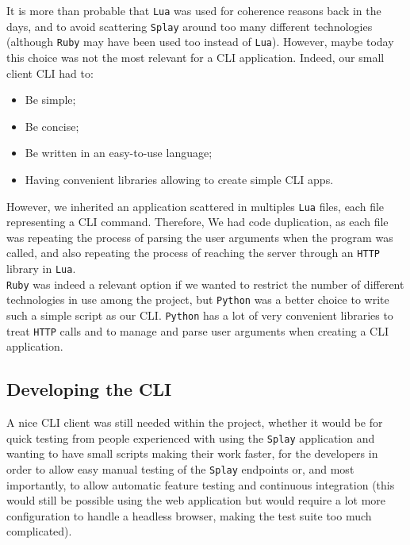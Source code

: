 \documentclass{eplmastersthesis}
\begin{document}
        It is more than probable that \texttt{Lua} was used for coherence reasons back
        in the days, and to avoid scattering \texttt{Splay} around too many different
        technologies (although \texttt{Ruby} may have been used too instead of \texttt{Lua}).
        However, maybe today this choice was not the most relevant for a CLI
        application. Indeed, our small client CLI had to:

        \begin{itemize}
          \item Be simple;
          \item Be concise;
          \item Be written in an easy-to-use language;
          \item Having convenient libraries allowing to create simple CLI apps.
        \end{itemize}

        However, we inherited an application scattered in multiples \texttt{Lua}
        files, each file representing a CLI command. Therefore, We had code
        duplication, as each file was repeating the process of parsing the user
        arguments when the program was called, and also repeating the process
        of reaching the server through an \texttt{HTTP} library in \texttt{Lua}.\\
        \texttt{Ruby} was indeed a relevant option if we wanted to restrict the number
        of different technologies in use among the project, but \texttt{Python} was
        a better choice to write such a simple script as our CLI. \texttt{Python} has
        a lot of very convenient libraries to treat \texttt{HTTP} calls and to
        manage and parse user arguments when creating a CLI application.

      \subsection{Developing the CLI}

        A nice CLI client was still needed within the project, whether it
        would be for quick testing from people experienced with using the
        \texttt{Splay} application and wanting to have small scripts making their
        work faster, for the developers in order to allow easy manual testing
        of the \texttt{Splay} endpoints or, and most importantly, to allow automatic
        feature testing and continuous integration (this would still be
        possible using the web application but would require a lot more
        configuration to handle a headless browser, making the test suite
        too much complicated).\\
\end{document}

